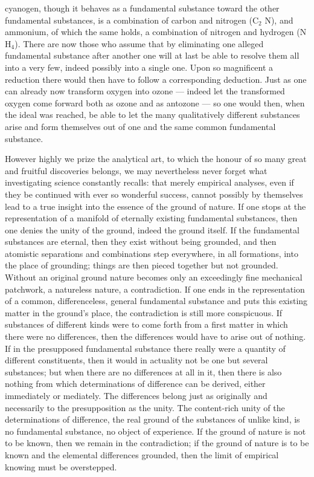 \documentclass[12pt,a4paper]{book}
\begin{document}
cyanogen, though it behaves as a fundamental substance toward the other fundamental substances, is a combination
of carbon and nitrogen (C$_2$ N), and ammonium, of which the same holds, a combination of nitrogen and hydrogen
(N H$_4$). There are now those who assume that by eliminating one alleged fundamental substance after another one
will at last be able to resolve them all into a very few, indeed possibly into a single one. Upon so magnificent
a reduction there would then have to follow a corresponding deduction. Just as one can already now transform
oxygen into ozone --- indeed let the transformed oxygen come forward both as ozone and as antozone --- so one
would then, when the ideal was reached, be able to let the many qualitatively different substances arise and form
themselves out of one and the same common fundamental substance.

However highly we prize the analytical art, to which the honour of so many great and fruitful discoveries belongs,
we may nevertheless never forget what investigating science constantly recalls: that merely empirical analyses,
even if they be continued with ever so wonderful success, cannot possibly by themselves lead to a true insight
into the essence of the ground of nature. If one stops at the representation of a manifold of eternally existing
fundamental substances, then one denies the unity of the ground, indeed the ground itself. If the fundamental
substances are eternal, then they exist without being grounded, and then atomistic separations and combinations
step everywhere, in all formations, into the place of grounding; things are then pieced together but not grounded.
Without an original ground nature becomes only an exceedingly fine mechanical patchwork, a natureless nature, a
contradiction. If one ends in the representation of a common, differenceless, general fundamental substance and
puts this existing matter in the ground's place, the contradiction is still more conspicuous. If substances of
different kinds were to come forth from a first matter in which there were no differences, then the differences
would have to arise out of nothing. If in the presupposed fundamental substance there really were a quantity of
different constituents, then it would in actuality not be one but several substances; but when there are no
differences at all in it, then there is also nothing from which determinations of difference can be derived, either
immediately or mediately. The differences belong just as originally and necessarily to the presupposition as the
unity. The content-rich unity of the determinations of difference, the real ground of the substances of unlike
kind, is no fundamental substance, no object of experience. If the ground of nature is not to be known, then we
remain in the contradiction; if the ground of nature is to be known and the elemental differences grounded, then
the limit of empirical knowing must be overstepped.
\end{document}
